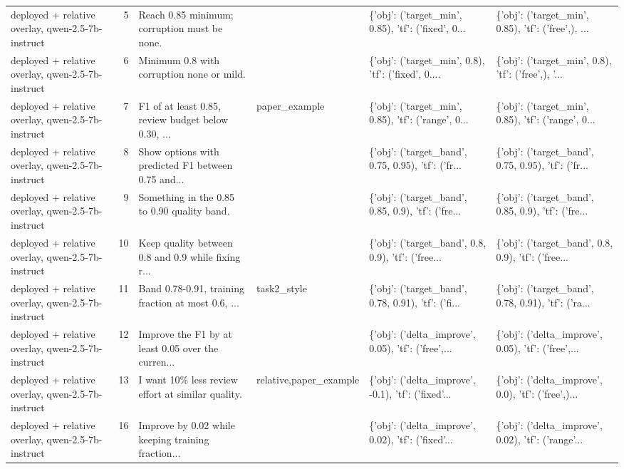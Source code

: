 \begin{tabular}{lrllll}
deployed + relative overlay, qwen-2.5-7b-instruct &    5 &       Reach 0.85 minimum; corruption must be none. &                        & \{'obj': ('target\_min', 0.85), 'tf': ('fixed', 0... & \{'obj': ('target\_min', 0.85), 'tf': ('free',), ... \\
deployed + relative overlay, qwen-2.5-7b-instruct &    6 &          Minimum 0.8 with corruption none or mild. &                        & \{'obj': ('target\_min', 0.8), 'tf': ('fixed', 0.... & \{'obj': ('target\_min', 0.8), 'tf': ('free',), '... \\
deployed + relative overlay, qwen-2.5-7b-instruct &    7 & F1 of at least 0.85, review budget below 0.30, ... &          paper\_example & \{'obj': ('target\_min', 0.85), 'tf': ('range', 0... & \{'obj': ('target\_min', 0.85), 'tf': ('range', 0... \\
deployed + relative overlay, qwen-2.5-7b-instruct &    8 & Show options with predicted F1 between 0.75 and... &                        & \{'obj': ('target\_band', 0.75, 0.95), 'tf': ('fr... & \{'obj': ('target\_band', 0.75, 0.95), 'tf': ('fr... \\
deployed + relative overlay, qwen-2.5-7b-instruct &    9 &        Something in the 0.85 to 0.90 quality band. &                        & \{'obj': ('target\_band', 0.85, 0.9), 'tf': ('fre... & \{'obj': ('target\_band', 0.85, 0.9), 'tf': ('fre... \\
deployed + relative overlay, qwen-2.5-7b-instruct &   10 & Keep quality between 0.8 and 0.9 while fixing r... &                        & \{'obj': ('target\_band', 0.8, 0.9), 'tf': ('free... & \{'obj': ('target\_band', 0.8, 0.9), 'tf': ('free... \\
deployed + relative overlay, qwen-2.5-7b-instruct &   11 & Band 0.78-0.91, training fraction at most 0.6, ... &            task2\_style & \{'obj': ('target\_band', 0.78, 0.91), 'tf': ('fi... & \{'obj': ('target\_band', 0.78, 0.91), 'tf': ('ra... \\
deployed + relative overlay, qwen-2.5-7b-instruct &   12 & Improve the F1 by at least 0.05 over the curren... &                        & \{'obj': ('delta\_improve', 0.05), 'tf': ('free',... & \{'obj': ('delta\_improve', 0.05), 'tf': ('free',... \\
deployed + relative overlay, qwen-2.5-7b-instruct &   13 &  I want 10\% less review effort at similar quality. & relative,paper\_example & \{'obj': ('delta\_improve', -0.1), 'tf': ('fixed'... & \{'obj': ('delta\_improve', 0.0), 'tf': ('free',)... \\
deployed + relative overlay, qwen-2.5-7b-instruct &   16 & Improve by 0.02 while keeping training fraction... &                        & \{'obj': ('delta\_improve', 0.02), 'tf': ('fixed'... & \{'obj': ('delta\_improve', 0.02), 'tf': ('range'... \\

\end{tabular}
